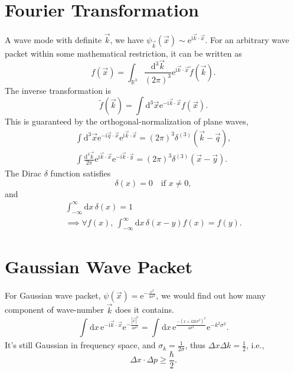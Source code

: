 \section{Fourier Transformation}
A wave mode with definite $\vec{k}$, we have $\psi_{\vec{k}} (\vec{x}) \sim \mathrm{e}^{\mathrm{i} \vec{k} \cdot \vec{x}}$. 
For an arbitrary wave packet within some mathematical restriction, it can be written as
\begin{equation}
  f(\vec{x}) = \int_{\mathbb{R}^{3}} \frac{\mathrm{d} ^{3}\vec{k}}{\left( 2\pi \right) ^{3}} \mathrm{e}^{\mathrm{i} \vec{k} \cdot \vec{x}} \tilde{f}(\vec{k}).
\end{equation}
The inverse transformation is
\begin{equation}
  \tilde{f}(\vec{k}) = \int \mathrm{d} ^{3}\vec{x} \mathrm{e}^{- \mathrm{i}  \vec{k} \cdot \vec{x}} f(\vec{x}).
\end{equation}
This is guaranteed by the orthogonal-normalization of plane waves,
\begin{equation}
  \begin{gathered}
    \int \mathrm{d} ^{3} \vec{x} \mathrm{e}^{- \mathrm{i}  \vec{q}\cdot \vec{x}} \mathrm{e}^{\mathrm{i} \vec{k}\cdot \vec{x}} = (2\pi)^{3} \delta^{(3)} (\vec{k} - \vec{q}),
    \\
    \int \frac{\mathrm{d} ^{3} \vec{k}}{2\pi} \mathrm{e}^{ \mathrm{i}  \vec{k}\cdot \vec{x}} \mathrm{e}^{-\mathrm{i} \vec{k}\cdot \vec{y}} = (2\pi)^{3} \delta^{(3)} (\vec{x} - \vec{y}).
  \end{gathered}
\end{equation}
The Dirac $\delta$ function satisfies
\begin{equation}
  \delta(x) = 0 \quad \text{if } x\neq 0,
\end{equation}
and
\begin{gather}
  \int_{-\infty}^{\infty} \mathrm{d}x \, \delta(x) = 1
  \\
  \implies \forall f(x),\  \int_{-\infty}^{\infty} \mathrm{d}x \, \delta(x-y)f(x) = f(y) .
\end{gather}

\section{Gaussian Wave Packet}
For Gaussian wave packet, $\psi(\vec{x}) = \mathrm{e}^{-\frac{x^{2}}{4 \sigma^2}}$, we would find out how many component of wave-number $\vec{k}$ does it contains. 
\begin{equation}
  \int_{}^{} \mathrm{d}x \, \mathrm{e}^{-\mathrm{i}  \vec{k}\cdot \vec{x}} \mathrm{e}^{- \frac{\left| \vec{x} \right| ^{2}}{4\sigma^{2}}} = \int_{}^{} \mathrm{d}x \, \mathrm{e}^{\frac{-\left( x + \mathrm{i} 2k \sigma^2 \right) ^2}{4\sigma ^2}} \mathrm{e}^{- k^2 \sigma^2}  .
\end{equation}
It's still Gaussian in frequency space, and $\sigma_{k} = \frac{1}{2\sigma}$, thus $\Delta x \Delta k = \frac{1}{2}$, i.e.,
\begin{equation}
    \Delta x \cdot \Delta p \ge \frac{\hbar}{2}.
\end{equation}

